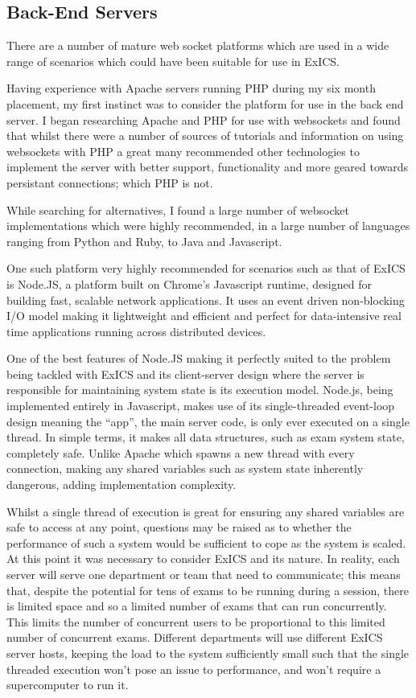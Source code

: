 \subsection{Back-End Servers}
\label{subs:exics_backend_server}

There are a number of mature web socket platforms which are used in a wide range of scenarios which could have been suitable for use in ExICS.

Having experience with Apache servers running PHP during my six month placement, my first instinct was to consider the platform for use in the back end server.  I began researching Apache and PHP for use with websockets and found that whilst there were a number of sources of tutorials and information on using websockets with PHP a great many recommended other technologies to implement the server with better support, functionality and more geared towards persistant connections; which PHP is not.

While searching for alternatives, I found a large number of websocket implementations which were highly recommended, in a large number of languages ranging from Python and Ruby, to Java and Javascript.

One such platform very highly recommended for scenarios such as that of ExICS \cite{whyNodeJS} is Node.JS, a platform built on Chrome's Javascript runtime, designed for building fast, scalable network applications.  It uses an event driven non-blocking I/O model making it lightweight and efficient and perfect for data-intensive real time applications running across distributed devices.\cite{nodeJS}

One of the best features of Node.JS making it perfectly suited to the problem being tackled with ExICS and its client-server design where the server is responsible for maintaining system state is its execution model.  Node.js, being implemented entirely in Javascript, makes use of its single-threaded event-loop design meaning the ``app'', the main server code, is only ever executed on a single thread.\cite{understandingNodeEventLoop}  In simple terms, it makes all data structures, such as exam system state, completely safe.  Unlike Apache which spawns a new thread with every connection, making any shared variables such as system state inherently dangerous, adding implementation complexity.

Whilst a single thread of execution is great for ensuring any shared variables are safe to access at any point, questions may be raised as to whether the performance of such a system would be sufficient to cope as the system is scaled.  At this point it was necessary to consider ExICS and its nature.  In reality, each server will serve one department or team that need to communicate; this means that, despite the potential for tens of exams to be running during a session, there is limited space and so a limited number of exams that can run concurrently.  This limits the number of concurrent users to be proportional to this limited number of concurrent exams.  Different departments will use different ExICS server hosts, keeping the load to the system sufficiently small such that the single threaded execution won't pose an issue to performance, and won't require a supercomputer to run it.

